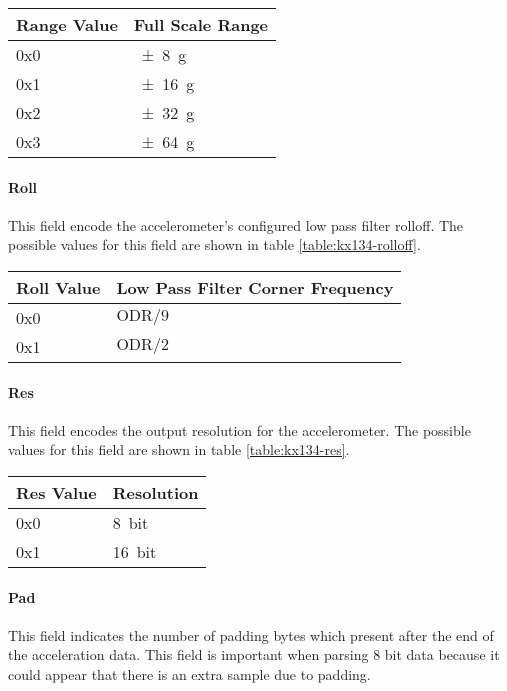 \begin{table*}[htb]
    \centering
    \begin{tabular}{@{}ll@{}}
        \toprule
        Range Value & Full Scale Range \\
        \midrule
        0x0         & {\SI{\pm 8}{g}}  \\
        0x1         & {\SI{\pm 16}{g}} \\
        0x2         & {\SI{\pm 32}{g}} \\
        0x3         & {\SI{\pm 64}{g}} \\
        \bottomrule
    \end{tabular}
    \caption{KX134-1211 Full Scale Range Values}
    \label{table:kx134-fsr}
\end{table*}

\paragraph{Roll}
This field encode the accelerometer's configured low pass filter rolloff. The possible values for this field are shown
in table \ref{table:kx134-rolloff}.

\begin{table*}[htb]
    \centering
    \begin{tabular}{@{}ll@{}}
        \toprule
        Roll Value & Low Pass Filter Corner Frequency \\
        \midrule
        0x0        & $\text{ODR} / 9$                 \\
        0x1        & $\text{ODR} / 2$                 \\
        \bottomrule
    \end{tabular}
    \caption{KX134-1211 Low Pass Filter Rolloff Values}
    \label{table:kx134-rolloff}
\end{table*}

\paragraph{Res}
This field encodes the output resolution for the accelerometer. The possible values for this field are shown in table
\ref{table:kx134-res}.

\begin{table*}[htb]
    \centering
    \begin{tabular}{@{}ll@{}}
        \toprule
        Res Value & Resolution     \\
        \midrule
        0x0       & {\SI{8}{bit}}  \\
        0x1       & {\SI{16}{bit}} \\
        \bottomrule
    \end{tabular}
    \caption{KX134-1211 Resolution Values}
    \label{table:kx134-res}
\end{table*}

\paragraph{Pad}
This field indicates the number of padding bytes which present after the end of the acceleration data. This field is
important when parsing 8 bit data because it could appear that there is an extra sample due to padding.
